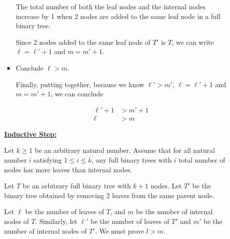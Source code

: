 \documentclass[12pt]{article}
\begin{document}
\begin{itemize}
\begin{mdframed}
\begin{enumerate}[1.]
\begin{itemize}
\begin{mdframed}
                \bigskip

                The total number of both the leaf nodes and the internal
                nodes increase by 1 when 2 nodes are added to the same leaf node
                in a full binary tree.

                \bigskip

                Since 2 nodes added to the same leaf node of $T'$ is $T$, we can
                write $\ell = \ell' + 1$ and $m = m' + 1$.

                \end{mdframed}

                \item Conclude $\ell > m$.

                \begin{mdframed}

                Finally, putting together, because we know $\ell' > m'$, $\ell = \ell' + 1$
                and $m = m' + 1$, we can conclude

                \begin{align}
                    \ell' + 1 &> m' + 1\\
                    \ell &> m
                \end{align}

                \end{mdframed}
            \end{itemize}

            \begin{mdframed}

            \underline{\textbf{Inductive Step:}}

            \bigskip

            Let $k \geq 1$ be an arbitrary natural number. Assume that for all natural
            number $i$ satisfying $1 \leq i \leq k$, any full binary trees with $i$
            total number of nodes has more leaves than internal nodes.

            \bigskip

            Let $T$ be an arbitrary full binary tree with $k+1$ nodes. Let $T'$
            be the binary tree obtained by removing 2 leaves from the same parent
            node.


            \bigskip

            Let $\ell$ be the number of leaves of $T$, and $m$ be the number of
            internal nodes of $T$. Similarly, let $\ell'$ be the number of leaves of
            $T'$ and $m'$ be the number of internal nodes of $T'$. We must prove
            $l > m$.


\end{mdframed}
\end{enumerate}
\end{mdframed}
\end{itemize}
\end{document}
